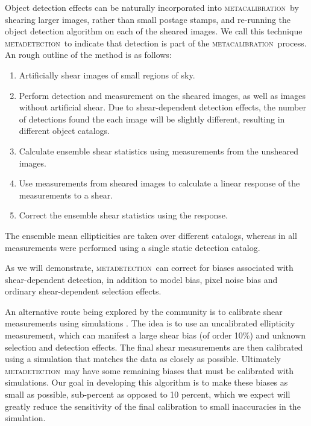 \documentclass[iop, twocolappendix, appendixfloats, numberedappendix, apj]{hackemulateapj}
\newcommand{\mcal}{\textsc{metacalibration}}
\newcommand{\mdet}{\textsc{metadetection}}
\begin{document}
Object detection effects can be naturally incorporated into \mcal\ by shearing
larger images, rather than small postage stamps, and re-running the object
detection algorithm on each of the sheared images.
We call this technique \mdet\ to indicate that detection is part of the \mcal\
process.  An rough outline of the method is as follows: \begin{enumerate}

    \item Artificially shear images of small regions of sky.

    \item Perform detection and measurement on the sheared images, as well as
        images without artificial shear.  Due to shear-dependent detection
        effects, the number of detections found the each image will be slightly
        different, resulting in different object catalogs.

    \item Calculate ensemble shear statistics using measurements from the
        unsheared images.

    \item Use measurements from sheared images to calculate a linear response
        of the measurements to a shear.

    \item Correct the ensemble shear statistics using the response.

\end{enumerate}
The ensemble mean ellipticities are taken over different catalogs, whereas in
\cite{SheldonMcal2017} all measurements were performed using a single static
detection catalog.  

As we will demonstrate, \mdet\ can correct for biases associated with
shear-dependent detection, in addition to model bias, pixel noise bias
and ordinary shear-dependent selection effects.

An alternative route being explored by the community is to calibrate shear
measurements using simulations \citep[see, e.g.,][]{KIDS450shear,HSCY1shear}.
The idea is to use an uncalibrated ellipticity measurement, which can manifest
a large shear bias (of order 10\%) and  unknown selection and detection
effects.  The final shear measurements are then calibrated using a simulation
that matches the data as closely as possible.  Ultimately \mdet\ may have some
remaining biases that must be calibrated with simulations.  Our goal in
developing this algorithm is to make these biases as small as possible,
sub-percent as opposed to 10 percent, which we expect will greatly reduce the
sensitivity of the final calibration to small inaccuracies in the simulation.
\end{document}
